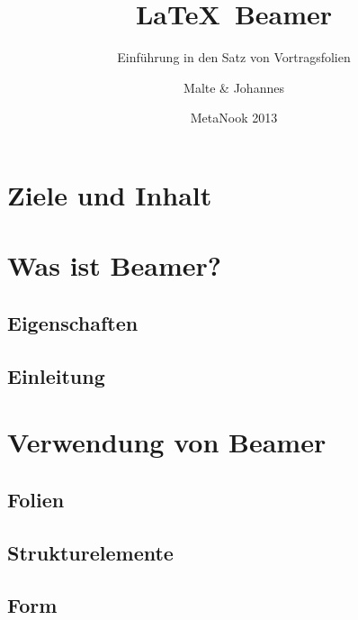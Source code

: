 \title{\LaTeX\ Beamer}
\subtitle{Einführung in den Satz von Vortragsfolien}
\author{Malte \& Johannes}
\date{MetaNook 2013}


  \section*{Ziele und Inhalt}

  \frame{}

  \section{Was ist Beamer?}

  \frame{}

  \subsection{Eigenschaften}

  \frame{}\frame{}\frame{}\frame{}

  \subsection{Einleitung}

  \frame{}\frame{}\frame{}

  \section{Verwendung von Beamer}

  \frame{}\frame{}\frame{}

  \subsection{Folien}

  \frame{}\frame{}\frame{}\frame{}\frame{}

  \subsection{Strukturelemente}

  \frame{}\frame{}\frame{}

  \subsection{Form}

  \frame{}\frame{}

